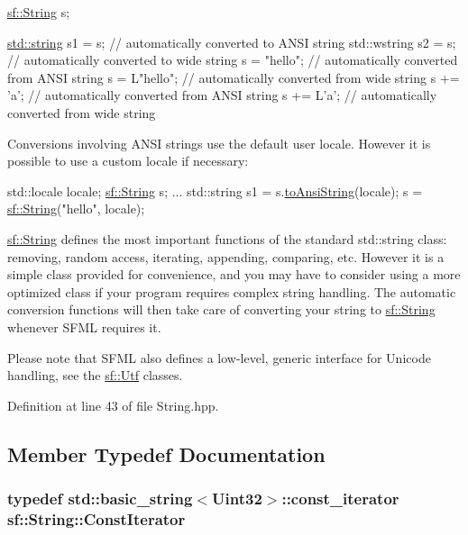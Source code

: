 \begin{DoxyCode}
\hyperlink{classsf_1_1_string}{sf::String} s;

\hyperlink{gl3_8h_ac83513893df92266f79a515488701770}{std::string} s1 = s;  \textcolor{comment}{// automatically converted to ANSI string}
std::wstring s2 = s; \textcolor{comment}{// automatically converted to wide string}
s = \textcolor{stringliteral}{"hello"};         \textcolor{comment}{// automatically converted from ANSI string}
s = L\textcolor{stringliteral}{"hello"};        \textcolor{comment}{// automatically converted from wide string}
s += \textcolor{charliteral}{'a'};            \textcolor{comment}{// automatically converted from ANSI string}
s += L\textcolor{charliteral}{'a'};           \textcolor{comment}{// automatically converted from wide string}
\end{DoxyCode}


Conversions involving A\-N\-S\-I strings use the default user locale. However it is possible to use a custom locale if necessary\-: 
\begin{DoxyCode}
std::locale locale;
\hyperlink{classsf_1_1_string}{sf::String} s;
...
std::string s1 = s.\hyperlink{classsf_1_1_string_a71d111ccfaf295b8b8be8ca4a3ceb5f4}{toAnsiString}(locale);
s = \hyperlink{classsf_1_1_string}{sf::String}(\textcolor{stringliteral}{"hello"}, locale);
\end{DoxyCode}


\hyperlink{classsf_1_1_string}{sf\-::\-String} defines the most important functions of the standard std\-::string class\-: removing, random access, iterating, appending, comparing, etc. However it is a simple class provided for convenience, and you may have to consider using a more optimized class if your program requires complex string handling. The automatic conversion functions will then take care of converting your string to \hyperlink{classsf_1_1_string}{sf\-::\-String} whenever S\-F\-M\-L requires it.

Please note that S\-F\-M\-L also defines a low-\/level, generic interface for Unicode handling, see the \hyperlink{classsf_1_1_utf}{sf\-::\-Utf} classes. 

Definition at line 43 of file String.\-hpp.



\subsection{Member Typedef Documentation}
\hypertarget{classsf_1_1_string_a8e18efc2e8464f6eb82818902d527efa}{
\subsubsection[{Const\-Iterator}]{\setlength{\rightskip}{0pt plus 5cm}typedef std\-::basic\-\_\-string$<${\bf Uint32}$>$\-::const\-\_\-iterator {\bf sf\-::\-String\-::\-Const\-Iterator}}}\label{classsf_1_1_string_a8e18efc2e8464f6eb82818902d527efa}



